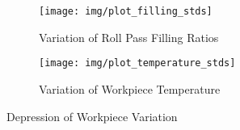 \begin{figure}
    \begin{subfigure}{\linewidth}
        \centering
        \texttt{[image: img/plot\_filling\_stds]}
        \caption{Variation of Roll Pass Filling Ratios}
        \label{fig:plot_filling_stds}
    \end{subfigure}
    \begin{subfigure}{\linewidth}
        \centering
        \texttt{[image: img/plot\_temperature\_stds]}
        \caption{Variation of Workpiece Temperature}
        \label{fig:plot_temperature_stds}
    \end{subfigure}
    \caption{Depression of Workpiece Variation}
\end{figure}

